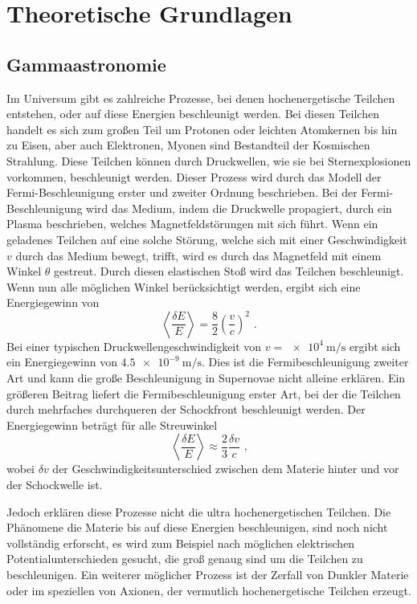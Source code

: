 \chapter{Theoretische Grundlagen}

\section{Gammaastronomie}

Im Universum gibt es zahlreiche Prozesse, bei denen hochenergetische Teilchen entstehen, oder auf diese Energien beschleunigt werden.
Bei diesen Teilchen handelt es sich zum großen Teil um Protonen oder leichten  Atomkernen bis hin zu Eisen, aber auch Elektronen, Myonen
sind Bestandteil der Kosmischen Strahlung.
Diese Teilchen können durch Druckwellen, wie sie bei Sternexplosionen vorkommen, beschleunigt werden.
Dieser Prozess wird durch das Modell der Fermi-Beschleunigung erster und zweiter Ordnung beschrieben.
Bei der Fermi-Beschleunigung wird das Medium, indem die Druckwelle propagiert, durch ein Plasma beschrieben, welches Magnetfeldstörungen mit sich führt.
Wenn ein geladenes Teilchen auf eine  solche Störung, welche sich mit einer Geschwindigkeit $v$ durch das Medium bewegt, trifft, wird es durch das Magnetfeld
mit einem Winkel $\theta$ gestreut.
Durch diesen elastischen Stoß wird das Teilchen beschleunigt.
Wenn nun alle möglichen Winkel berücksichtigt werden, ergibt sich eine Energiegewinn von
\begin{equation*}
  \left\langle \frac{\delta E}{E} \right\rangle = \frac{8}{2}\left(\frac{v}{c}\right)^2\text{ .}
\end{equation*}
Bei einer typischen Druckwellengeschwindigkeit von $v=\SI{e4}{\m\per\s}$\cite[14]{HESS} ergibt sich ein Energiegewinn von $\SI{4.5e-9}{\m\per\s}$.
Dies ist die Fermibeschleunigung zweiter Art und kann die große Beschleunigung in Supernovae nicht alleine erklären.
Ein größeren Beitrag liefert die Fermibeschleunigung erster Art, bei der die Teilchen durch mehrfaches durchqueren der Schockfront beschleunigt werden.
Der Energiegewinn beträgt für alle Streuwinkel
\begin{equation*}
  \left\langle \frac{\delta E}{E} \right\rangle \approx \frac{2}{3}\frac{\delta v}{c} \text{ ,}
\end{equation*}
wobei $\delta v$ der Geschwindigkeitsunterschied zwischen dem Materie hinter und vor der Schockwelle ist.

Jedoch erklären diese Prozesse nicht die ultra hochenergetischen Teilchen.
Die Phänomene die Materie bis auf diese Energien beschleunigen, sind noch nicht vollständig erforscht, es wird zum Beispiel nach möglichen elektrischen
Potentialunterschieden gesucht, die groß genaug sind um die Teilchen zu beschleunigen.
Ein weiterer möglicher Prozess ist der Zerfall von Dunkler Materie oder im speziellen von Axionen, der vermutlich hochenergetische Teilchen erzeugt.


